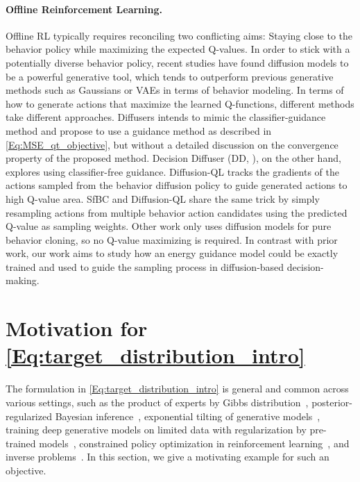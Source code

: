 \paragraph{Offline Reinforcement Learning.}
Offline RL typically requires reconciling two conflicting aims: Staying close to the behavior policy while maximizing the expected Q-values. In order to stick with a potentially diverse behavior policy, recent studies \cite{diffuser, arq, dql, sfbc, dd, csbc} have found diffusion models to be a powerful generative tool, which tends to outperform previous generative methods such as Gaussians \citep{awr, crr, awac} or VAEs \cite{bcq, bear} in terms of behavior modeling. In terms of how to generate actions that maximize the learned Q-functions, different methods take different approaches. Diffusers \cite{diffuser} intends to mimic the classifier-guidance method \cite{diffusion_beat_gan} and propose to use a guidance method as described in \eqref{Eq:MSE_qt_objective}, but without a detailed discussion on the convergence property of the proposed method. Decision Diffuser (DD, \citet{dd}), on the other hand, explores using classifier-free guidance. Diffusion-QL tracks the gradients of the actions sampled from the behavior diffusion policy to guide generated actions to high Q-value area. SfBC \citep{sfbc} and Diffusion-QL share the same trick by simply resampling actions from multiple behavior action candidates using the predicted Q-value as sampling weights. Other work \cite{arq, csbc} only uses diffusion models for pure behavior cloning, so no Q-value maximizing is required. 
In contrast with prior work, our work aims to study how an energy guidance model could be exactly trained and used to guide the sampling process in diffusion-based decision-making.


\section{Motivation for \eqref{Eq:target_distribution_intro}}
The formulation in \eqref{Eq:target_distribution_intro} is general and common across various settings, such as the product of experts by Gibbs distribution~\citep{hinton2002training}, posterior-regularized Bayesian inference~\citep{zhu2014bayesian}, exponential tilting of generative models~\citep{xiao2020exponential}, training deep generative models on limited data with regularization by pre-trained models~\citep{zhong2022deep}, constrained policy optimization in reinforcement learning~\citep{awr,ziegler2019fine}, and inverse problems~\citep{chung2022diffusion}. In this section, we give a motivating example for such an objective.

